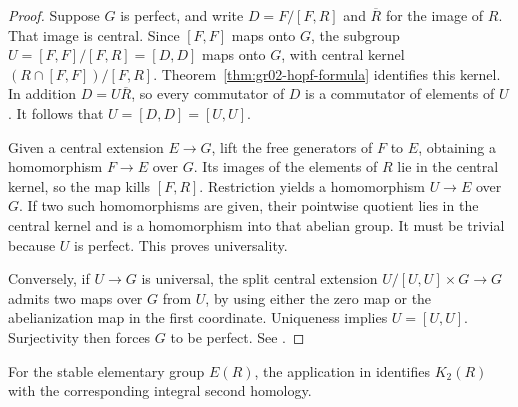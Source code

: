\begin{proof}
Suppose \(G\) is perfect, and write \(D=F/[F,R]\) and
\(\overline R\) for the image of \(R\). That image is central.
Since \([F,F]\) maps onto \(G\), the subgroup
\(U=[F,F]/[F,R]=[D,D]\) maps onto \(G\), with central kernel
\((R\cap[F,F])/[F,R]\). Theorem~\ref{thm:gr02-hopf-formula}
identifies this kernel. In addition \(D=U\overline R\), so
every commutator of \(D\) is a commutator of elements of \(U\).
It follows that \(U=[D,D]=[U,U]\).

Given a central extension \(E\to G\), lift the free generators
of \(F\) to \(E\), obtaining a homomorphism \(F\to E\) over
\(G\). Its images of the elements of \(R\) lie in the central
kernel, so the map kills \([F,R]\). Restriction yields a
homomorphism \(U\to E\) over \(G\). If two such homomorphisms
are given, their pointwise quotient lies in the central kernel
and is a homomorphism into that abelian group. It must be
trivial because \(U\) is perfect. This proves universality.

Conversely, if \(U\to G\) is universal, the split central
extension \(U/[U,U]\times G\to G\) admits two maps over \(G\)
from \(U\), by using either the zero map or the abelianization
map in the first coordinate. Uniqueness implies \(U=[U,U]\).
Surjectivity then forces \(G\) to be perfect.
See \cite[Theorem 6.9.5]{weibel}.
\end{proof}

For the stable elementary group \(E(R)\), the application in
\cite[B12]{ktheory} identifies \(K_2(R)\) with the corresponding
integral second homology.
